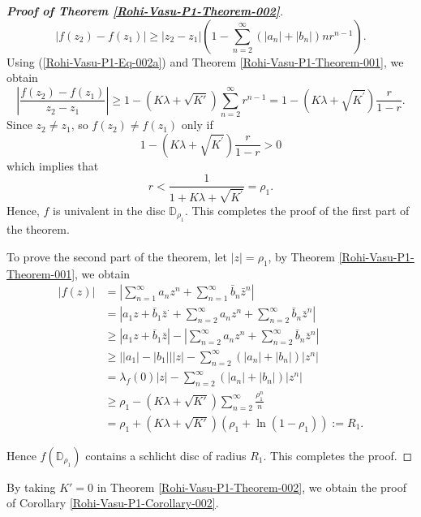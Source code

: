 \documentclass[a4paper,12pt]{amsart}
\theoremstyle{plain}
\theoremstyle{definition}
\begin{document}
\begin{proof}[{\bf Proof of Theorem   \ref{Rohi-Vasu-P1-Theorem-002}}]
\begin{equation}
|f(z_2)-f(z_1)| \geq \left|z_2-z_1\right|\left(1-\sum_{n=2}^{\infty}\left(\left|a_n\right|+\left|b_n\right|\right) n r^{n-1}\right).
\end{equation}
Using (\ref{Rohi-Vasu-P1-Eq-002a}) and Theorem {\ref{Rohi-Vasu-P1-Theorem-001}}, we obtain
$$
\left|\frac{f(z_2)-f(z_1)}{z_2-z_1}\right| \geq 1-\left(K \lambda+\sqrt{K'}\right) \sum_{n=2}^{\infty} r^{n-1}=1-\left(K \lambda+\sqrt{K^{\prime}}\right) \frac{r}{1-r}.
$$
Since $z_2 \neq z_1$, so $f\left(z_2\right) \neq f\left(z_1\right)$ only if
$$
1-\left(K \lambda+\sqrt{K^{\prime}}\right) \frac{r}{1-r}>0 
$$
which implies that
$$
  r<\frac{1}{1+K\lambda+\sqrt{K^{\prime}}}=\rho_1.
$$
Hence, $f$ is univalent in the disc $\mathbb{D}_{\rho_1}.$
This completes the proof of the first part of the theorem.

To prove the second part of the theorem, let $|z|=\rho_1$, by Theorem {\ref{Rohi-Vasu-P1-Theorem-001}}, we obtain
\begin{align*}
|f(z)|&=\left|\sum_{n=1}^{\infty} a_n z^n+\sum_{n=1}^{\infty} \bar{b}_n \bar{z}^n\right| \\
&=\left|a_1 z+\bar{b}_1 \bar{z}^{\cdot}+\sum_{n=2}^{\infty} a_n z^n+\sum_{n=2}^{\infty} \bar{b}_n \bar{z}^n\right| \\
& \geq\left|a_1 z+\bar{b}_1 \bar{z}\right|-\left|\sum_{n=2}^{\infty} a_n z^n+\sum_{n=2}^{\infty} \bar{b}_n \bar{z}^n\right| \\
&\geq \left|\left|a_1\right|-\left|b_1\right|\right|| z|-\sum_{n=2}^{\infty}\left(\left|a_n\right|+\left|b_n\right|\right)\left|z^n\right| \\
&=\lambda_f(0)|z|-\sum_{n=2}^{\infty}\left(\left|a_n\right|+\left|b_n\right|\right)\left|z^n\right|\\
& \geq \rho_1-(K \lambda+\sqrt{K'})\sum_{n=2}^{\infty} \frac{\rho_1^n}{n}  \\
&=\rho_1+\left(K \lambda+\sqrt{K'}\right)\left(\rho_1+\ln \left(1-\rho
_1\right)\right) := R_1.
\end{align*}

Hence $f\left(\mathbb{D}_{\rho_1}\right)$ contains a schlicht disc of radius $R_1$. This completes the proof.

\end{proof}
By taking $K'=0$ in Theorem \ref{Rohi-Vasu-P1-Theorem-002}, we obtain the proof of Corollary  \ref{Rohi-Vasu-P1-Corollary-002}.
\end{document}
